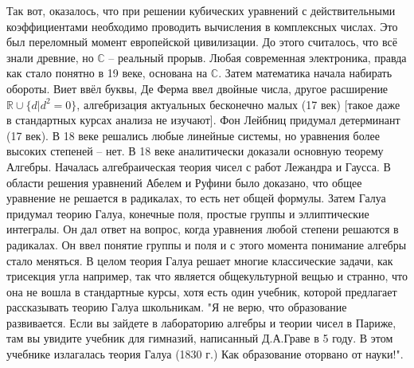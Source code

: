 \documentclass{book}
\begin{document}
Так вот, оказалось, что при решении кубических уравнений с действительными
коэффициентами необходимо проводить вычисления в комплексных числах. Это был
переломный момент европейской цивилизации. До этого считалось, что всё знали
древние, но $\mathbb{C}$ – реальный прорыв. Любая современная электроника,
правда как стало понятно в 19 веке, основана на $\mathbb{C}$. Затем математика
начала набирать обороты. Виет ввёл буквы, Де Ферма ввел двойные числа, другое
расширение $\mathbb{R}\cup\{d|d^2 = 0\}$, алгебризация актуальных бесконечно
малых (17 век) [такое даже в стандартных курсах анализа не изучают]. Фон Лейбниц
придумал детерминант (17 век). В 18 веке решались любые линейные системы, но
уравнения более высоких степеней – нет. В 18 веке аналитически доказали основную
теорему Алгебры. Началась алгебраическая теория чисел с работ Лежандра и Гаусса.
В области решения уравнений Абелем и Руфини было доказано, что общее уравнение
не решается в радикалах, то есть нет общей формулы. Затем Галуа придумал
теорию Галуа, конечные поля, простые группы и эллиптические интегралы. Он дал
ответ на вопрос, когда уравнения любой степени решаются в радикалах. Он ввел
понятие группы и поля и с этого момента понимание алгебры стало меняться. В
целом теория Галуа решает многие классические задачи, как трисекция угла
например, так что является общекультурной вещью и странно, что она не вошла в
стандартные курсы, хотя есть один учебник, которой предлагает рассказывать
теорию Галуа школьникам. "Я не верю, что образование развивается. Если вы
зайдете в лабораторию алгебры и теории чисел в Париже, там вы увидите учебник
для гимназий, написанный Д.А.Граве в 5 году. В этом учебнике излагалась теория
Галуа (1830 г.) Как образование оторвано от науки!".
\end{document}
